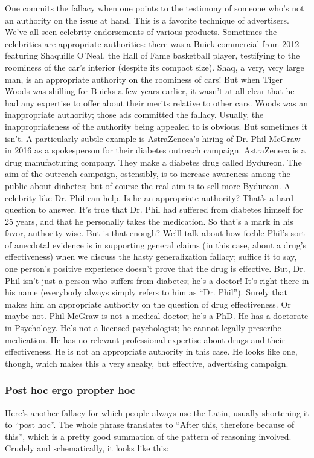 One commits the fallacy when one points to the testimony of someone who's not an authority on
the issue at hand. This is a favorite technique of advertisers. We've all seen celebrity endorsements
of various products. Sometimes the celebrities are appropriate authorities: there was a Buick
commercial from 2012 featuring Shaquille O'Neal, the Hall of Fame basketball player, testifying
to the roominess of the car's interior (despite its compact size). Shaq, a very, very large man, is an
appropriate authority on the roominess of cars! But when Tiger Woods was shilling for Buicks a
few years earlier, it wasn't at all clear that he had any expertise to offer about their merits relative
to other cars. Woods was an inappropriate authority; those ads committed the fallacy.
Usually, the inappropriateness of the authority being appealed to is obvious. But sometimes it isn't.
A particularly subtle example is AstraZeneca's hiring of Dr. Phil McGraw in 2016 as a
spokesperson for their diabetes outreach campaign. AstraZeneca is a drug manufacturing
company. They make a diabetes drug called Bydureon. The aim of the outreach campaign,
ostensibly, is to increase awareness among the public about diabetes; but of course the real aim is
to sell more Bydureon. A celebrity like Dr. Phil can help. Is he an appropriate authority? That's a
hard question to answer. It's true that Dr. Phil had suffered from diabetes himself for 25 years, and
that he personally takes the medication. So that's a mark in his favor, authority-wise. But is that
enough? We'll talk about how feeble Phil's sort of anecdotal evidence is in supporting general
claims (in this case, about a drug's effectiveness) when we discuss the hasty generalization fallacy;
suffice it to say, one person's positive experience doesn't prove that the drug is effective. But, Dr.
Phil isn't just a person who suffers from diabetes; he's a doctor! It's right there in his name
(everybody always simply refers to him as ``Dr. Phil''). Surely that makes him an appropriate
authority on the question of drug effectiveness. Or maybe not. Phil McGraw is not a medical
doctor; he's a PhD. He has a doctorate in Psychology. He's not a licensed psychologist; he cannot
legally prescribe medication. He has no relevant professional expertise about drugs and their
effectiveness. He is not an appropriate authority in this case. He looks like one, though, which
makes this a very sneaky, but effective, advertising campaign.

\subsubsection{Post hoc ergo propter hoc}
Here's another fallacy for which people always use the Latin, usually shortening it to ``post hoc''.
The whole phrase translates to ``After this, therefore because of this'', which is a pretty good
summation of the pattern of reasoning involved. Crudely and schematically, it looks like this:

